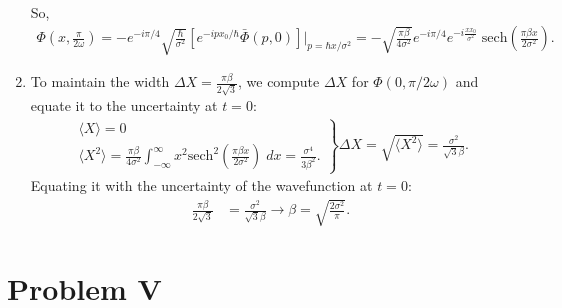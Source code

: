 \documentclass[letterpaper,11pt,twoside]{article}
\newcommand{\braket}[1]{\langle#1\rangle}
\begin{document}
\begin{enumerate}[itemsep=0pt,topsep=0pt,label=\alph*)]
\begin{align*}
  \end{align*}
  So,
  \begin{align*}
    \Phi(x,\frac{\pi}{2\omega})=-e^{-i\pi/4}\sqrt{\frac{\hbar}{\sigma^2}}\left[e^{-ipx_0/\hbar}\bar{\Phi}(p,0)\right]\biggr|_{p=\hbar x/\sigma^2}=-\sqrt{\frac{\pi\beta}{4\sigma^2}}e^{-i\pi/4}e^{-i\frac{xx_0}{\sigma^2}}\;\text{sech}(\frac{\pi\beta x}{2\sigma^2}).
  \end{align*}
  \item To maintain the width $\Delta X=\frac{\pi\beta}{2\sqrt{3}}$, we compute $\Delta X$ for $\Phi(0,\pi/2\omega)$ and equate it to the uncertainty at $t=0$:
  \begin{align*}
    \left.
    \begin{array}{l}
      \braket{X}=0\\
      \displaystyle\braket{X^2}=\frac{\pi\beta}{4\sigma^2}\int_{-\infty}^\infty x^2\text{sech}^2(\frac{\pi\beta x}{2\sigma^2})\;dx=\frac{\sigma^4}{3\beta^2}.
    \end{array}\right\}\Delta X=\sqrt{\braket{X^2}}=\frac{\sigma^2}{\sqrt{3}\beta}.
  \end{align*} 
  Equating it with the uncertainty of the wavefunction at $t=0$:
  \begin{align*}
    \frac{\pi\beta}{2\sqrt{3}}&=\frac{\sigma^2}{\sqrt{3}\beta}\longrightarrow\beta=\sqrt{\frac{2\sigma^2}{\pi}}.
  \end{align*}
\end{enumerate}

\section*{Problem V}





%
\end{document}
